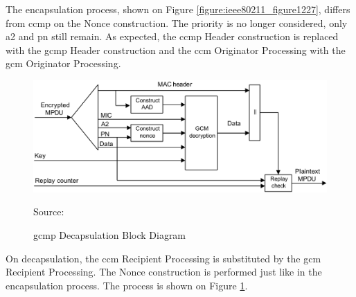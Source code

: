 The encapsulation process, shown on Figure \ref{figure:ieee80211_figure1227}, differs from \gls{ccmp} on the Nonce construction. The priority is no longer considered, only \gls{a2} and \gls{pn} still remain. As expected, the \gls{ccmp} Header construction is replaced with the \gls{gcmp} Header construction and the \gls{ccm} Originator Processing with the \gls{gcm} Originator Processing.

\begin{figure}[h]
    \centering
    \includegraphics[width=\linewidth]{contents/background-in-wireless-networks/protected-network-standards/wpa3/gcmp/gcmp-decapsulation-block-diagram.png}
    \caption{\gls{gcmp} Decapsulation Block Diagram}
    {Source: \cite{ieee_80211_2020}}
    \label{figure:ieee80211_figure1229}
\end{figure}

On decapsulation, the \gls{ccm} Recipient Processing is substituted by the \gls{gcm} Recipient Processing. The Nonce construction is performed just like in the encapsulation process. The process is shown on Figure \ref{figure:ieee80211_figure1229}.

\FloatBarrier
